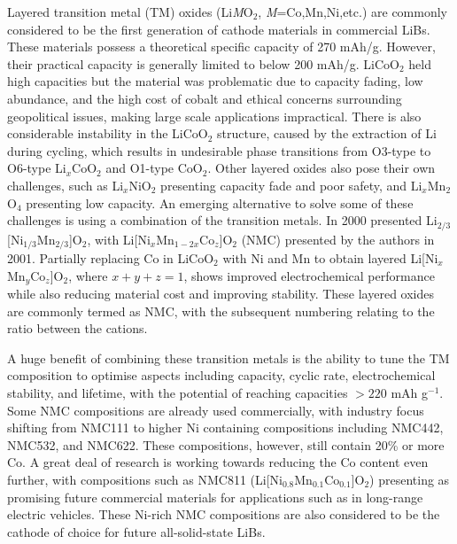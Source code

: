 \documentclass[../main.tex]{subfiles}
\begin{document}
Layered transition metal (TM) oxides (Li\textit{M}O$_2$, \textit{M}=Co,Mn,Ni,etc.) are commonly considered to be the first generation of cathode materials in commercial LiBs. These materials possess a theoretical specific capacity of 270 mAh/g. However, their practical capacity is generally limited to below 200 mAh/g. \cite{myung2017nickel} LiCoO$_2$ held high capacities but the material was problematic due to capacity fading, low abundance, and the high cost of cobalt and ethical concerns surrounding geopolitical issues, making large scale applications impractical. \cite{mo2018impact} There is also considerable instability in the LiCoO$_2$ structure, caused by the extraction of Li during cycling, which results in undesirable phase transitions from O3-type to O6-type Li$_x$CoO$_2$ and O1-type CoO$_2$. \cite{goonetilleke2018structural,chen2002staging} Other layered oxides also pose their own challenges, such as Li$_x$NiO$_2$ presenting capacity fade and poor safety, \cite{min2016comparative} and Li$_x$Mn$_2$O$_4$ presenting low capacity. \cite{tian2018performance} An emerging alternative to solve some of these challenges is using a combination of the transition metals. In 2000 \citeauthor{paulsen2000o2} presented Li$_{2/3}$[Ni$_{1/3}$Mn$_{2/3}$]O$_2$, \cite{paulsen2000o2,paulsen20002} with Li[Ni$_x$Mn$_{1-2x}$Co$_z$]O$_2$ (NMC) presented by the authors in 2001. \cite{lu2001layered} Partially replacing Co in LiCoO$_2$ with Ni and Mn to obtain layered Li[Ni$_x$Mn$_y$Co$_z$]O$_2$, \cite{rozier2015li} where $x+y+z=1$, shows improved electrochemical performance while also reducing material cost and improving stability.\cite{ohzuku2001layered} These layered oxides are commonly termed as NMC, with the subsequent numbering relating to the ratio between the cations.

A huge benefit of combining these transition metals is the ability to tune the TM composition to optimise aspects including capacity, cyclic rate, electrochemical stability, and lifetime, with the potential of reaching capacities $>220$ mAh g$^{-1}$. \cite{duan2019insights} Some NMC compositions are already used commercially, with industry focus shifting from NMC111 to higher Ni containing compositions including NMC442, NMC532, and NMC622. \cite{zhang2018structural} These compositions, however, still contain 20\% or more Co. A great deal of research is working towards reducing the Co content even further, with compositions such as NMC811 (Li[Ni$_{0.8}$Mn$_{0.1}$Co$_{0.1}$]O$_2$) presenting as promising future commercial materials for applications such as in long-range electric vehicles. \cite{azevedo2018mining} These Ni-rich NMC compositions are also considered to be the cathode of choice for future all-solid-state LiBs. \cite{myung2017nickel}
\end{document}
